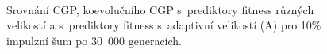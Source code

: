 \documentclass[czech]{ExcelAtFIT} %
\begin{document}
\begin{figure}[htb]
    \centering
    \\
    \caption{Srovnání CGP, koevolučního CGP s~prediktory fitness různých velikostí a s~prediktory fitness s~adaptivní velikostí (A) pro 10\% impulzní šum po 30~000 generacích.}
    \label{fig:ImpulseBoxplot}
\end{figure}
\end{document}
